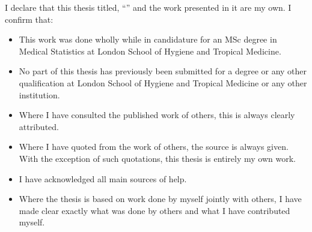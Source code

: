 \documentclass[
12pt, %
english, %
singlespacing, %
headsepline, %
table]{MastersDoctoralThesis} %
\begin{document}
\onehalfspacing

\begin{declaration}
\addchaptertocentry{\authorshipname} %
\noindent I declare that this thesis titled, \enquote{\ttitle} and the work presented in it are my own. I confirm that:

\begin{itemize}
\item This work was done wholly while in candidature for an MSc degree in Medical Statistics at London School of Hygiene and Tropical Medicine.
\item No part of this thesis has previously been submitted for a degree or any other qualification at London School of Hygiene and Tropical Medicine or any other institution.
\item Where I have consulted the published work of others, this is always clearly attributed.
\item Where I have quoted from the work of others, the source is always given. With the exception of such quotations, this thesis is entirely my own work.
\item I have acknowledged all main sources of help.
\item Where the thesis is based on work done by myself jointly with others, I have made clear exactly what was done by others and what I have contributed myself.\\
\end{itemize}

%
\end{declaration}

\end{document}
